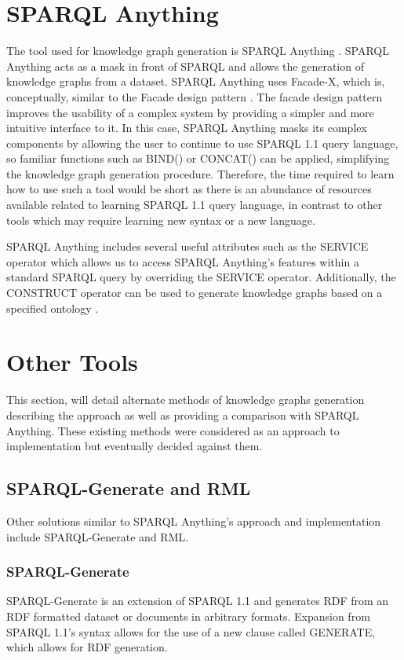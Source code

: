 \section{SPARQL Anything}
\hspace{0.5cm} The tool used for knowledge graph generation is SPARQL Anything \cite{sparqlanythinggithub}. SPARQL Anything acts as a mask in front of SPARQL and allows the generation of knowledge graphs from a dataset. SPARQL Anything uses Facade-X, which is, conceptually, similar to the Facade design pattern \cite{sparqlanything}. The facade design pattern improves the usability of a complex system by providing a simpler and more intuitive interface to it. In this case, SPARQL Anything masks its complex components by allowing the user to continue to use SPARQL 1.1 query language, so familiar functions such as BIND() or CONCAT() can be applied, simplifying the knowledge graph generation procedure. Therefore, the time required to learn how to use such a tool would be short as there is an abundance of resources available related to learning SPARQL 1.1 query language, in contrast to other tools which may require learning new syntax or a new language. 

SPARQL Anything includes several useful attributes such as the SERVICE operator which allows us to access SPARQL Anything's features within a standard SPARQL query by overriding the SERVICE operator. Additionally, the CONSTRUCT operator can be used to generate knowledge graphs based on a specified ontology \cite{sparqlanythinggithub}.

\section{Other Tools}
\hspace{0.5cm} This section, will detail alternate methods of knowledge graphs generation describing the approach as well as providing a comparison with SPARQL Anything. These existing methods were considered as an approach to implementation but eventually decided against them. 

\subsection{SPARQL-Generate and RML}
\hspace{0.5cm} Other solutions similar to SPARQL Anything's approach and implementation include SPARQL-Generate and RML. 

\subsubsection{SPARQL-Generate}
\hspace{0.5cm} SPARQL-Generate is an extension of SPARQL 1.1 and generates RDF from an RDF formatted dataset or documents in arbitrary formats. Expansion from SPARQL 1.1's syntax allows for the use of a new clause called GENERATE, which allows for RDF generation. \cite{lefranccois2017sparql}


